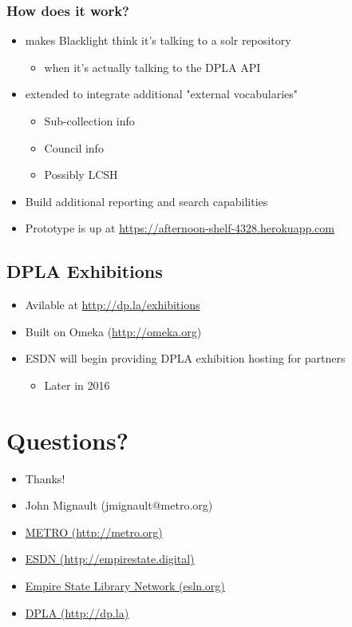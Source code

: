 \documentclass[11pt]{article}
\begin{document}
\subsubsection*{How does it work?}
\label{sec:org6a2481c}
\begin{itemize}
\item makes Blacklight think it's talking to a solr repository
\begin{itemize}
\item when it's actually talking to the DPLA API
\end{itemize}
\item extended to integrate additional "external vocabularies"
\begin{itemize}
\item Sub-collection info
\item Council info
\item Possibly LCSH
\end{itemize}
\item Build additional reporting and search capabilities
\item Prototype is up at \href{https://afternoon-shelf-4328.herokuapp.com}{\url{https://afternoon-shelf-4328.herokuapp.com}}
\end{itemize}

\subsection*{DPLA Exhibitions}
\label{sec:org2e21526}
\begin{itemize}
\item Avilable at \href{http://dp.la/exhibitions}{\url{http://dp.la/exhibitions}}
\item Built on Omeka (\href{http://omeka.org}{\url{http://omeka.org}})
\item ESDN will begin providing DPLA exhibition hosting for partners
\begin{itemize}
\item Later in 2016
\end{itemize}
\end{itemize}

\section*{Questions?}
\label{sec:orgd4a06c2}
\begin{itemize}
\item Thanks!
\item John Mignault (jmignault@metro.org)
\item \href{http://metro.org}{METRO (\url{http://metro.org})}
\item \href{http://empirestate.digital}{ESDN (\url{http://empirestate.digital})}
\item \href{http://esln.org}{Empire State Library Network (esln.org)}
\item \href{http://dp.la}{DPLA (\url{http://dp.la})}
\end{itemize}
\end{document}
